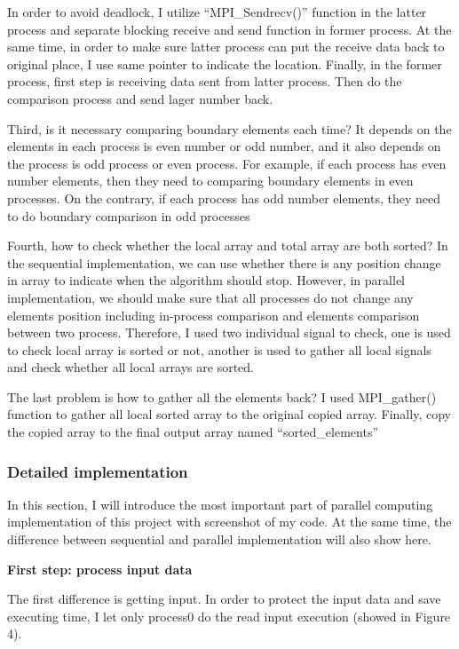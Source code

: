 In order to avoid deadlock, I utilize “MPI\_Sendrecv()” function in the latter process and separate blocking receive and send function in former process. At the same time, in order to make sure latter process can put the receive data back to original place, I use same pointer to indicate the location. Finally, in the former process, first step is receiving data sent from latter process. Then do the comparison process and send lager number back.

Third, is it necessary comparing boundary elements each time? It depends on the elements in each process is even number or odd number, and it also depends on the process is odd process or even process. For example, if each process has even number elements, then they need to comparing boundary elements in even processes. On the contrary, if each process has odd number elements, they need to do boundary comparison in odd processes

Fourth, how to check whether the local array and total array are both sorted? In the sequential implementation, we can use whether there is any position change in array to indicate when the algorithm should stop. However, in parallel implementation, we should make sure that all processes do not change any elements position including in-process comparison and elements comparison between two process. Therefore, I used two individual signal to check, one is used to check local array is sorted or not, another is used to gather all local signals and check whether all local arrays are sorted.

The last problem is how to gather all the elements back? I used MPI\_gather() function to gather all local sorted array to the original copied array. Finally, copy the copied array to the final output array named “sorted\_elements”

\subsubsection{Detailed implementation}

In this section, I will introduce the most important part of parallel computing implementation of this project with screenshot of my code. At the same time, the difference between sequential and parallel implementation will also show here.

\textbf{First step: process input data}

The first difference is getting input. In order to protect the input data and save executing time, I let only process0 do the read input execution (showed in Figure 4).

